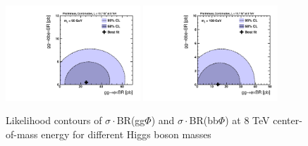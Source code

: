 \vspace*{1cm}


\begin{figure}[!h]\begin{center}
 \includegraphics[width=0.45\textwidth]{MSSM/PLOTS/cmb-ggH-bbH-scan-GGH-BBH-90.pdf}
 \includegraphics[width=0.45\textwidth]{MSSM/PLOTS/cmb-ggH-bbH-scan-GGH-BBH-100.pdf}
 \caption{Likelihood contours of $\sigma\cdot$BR(gg$\Phi$) and $\sigma\cdot$BR(bb$\Phi$) at 8 TeV center-of-mass energy for different Higgs boson masses}
  \label{fig:contour1}\end{center}\end{figure}






